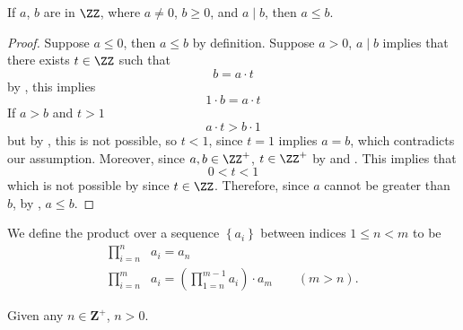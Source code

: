 \begin{lemma} \label{a_div_b_then_a_leq_b}
    If $a$, $b$ are in $\ZZ$, where $a \neq 0$, $b \geq 0$, and $a \mid b$, then $a \leq b$.  
\end{lemma}

\begin{proof}
    Suppose $a \leq 0$, then $a \leq b$ by definition.
    \newline
    Suppose $a >0$, $a \mid b$ implies that there exists $t \in \ZZ$ such that
    \[b=a \cdot t\]
    by , this implies
    \[1 \cdot b=a \cdot t\]
    If $a>b$ and $t>1$ 
    \[a \cdot t > b \cdot 1\]
    but by , this is not possible, so $t<1$, since $t=1$ implies $a=b$, which contradicts our assumption. Moreover, since $a,b \in \ZZ^+$, $t \in \ZZ^+$ by  and . This implies that
    \[0<t<1\]
    which is not possible by  since $t \in \ZZ$. Therefore, since $a$ cannot be greater than $b$, by , $a \leq b$.
\end{proof}

\begin{definition}\label{def_product_notation}
    We define the product over a sequence $\left\{a_i \right\}$ between indices $1\leq n<m$ to be
    \begin{equation*}
        \begin{aligned}
            \prod_{i=n}^n &a_i=a_n\\
            \prod_{i=n}^m &a_i=\left( \prod_{1=n}^{m-1} a_i \right) \cdot a_m \qquad (m>n).
        \end{aligned}
    \end{equation*}
\end{definition}

\begin{corollary}\label{pos-geq-0}
    Given any $n \in \mathbf{Z}^+$, $n > 0$.
\end{corollary}

